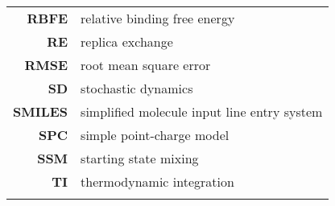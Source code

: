 \begin{center}
\begin{longtable}{ >{\bfseries}r l}
 RBFE & relative binding free energy \\
 RE   & replica exchange\\
 RMSE & root mean square error\\

 SD   & stochastic dynamics\\
 SMILES & simplified molecule input line entry system\\
 SPC  & simple point-charge model\\
 SSM  & starting state mixing \\
 
 TI   & thermodynamic integration \\
\label{tab:abbreviations}
\end{longtable}
\end{center}
